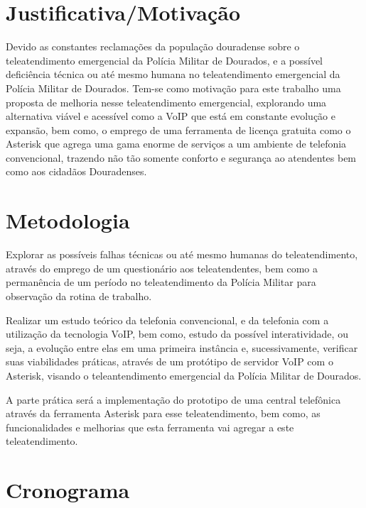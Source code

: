 \section{Justificativa/Motivação}
Devido as constantes reclamações da população douradense sobre o teleatendimento emergencial da Polícia Militar de Dourados, e a possível deficiência técnica ou até mesmo humana no teleatendimento emergencial da Polícia Militar de Dourados. Tem-se como motivação para este trabalho uma proposta de melhoria nesse teleatendimento emergencial, explorando uma alternativa viável e acessível como a VoIP que está em constante evolução e expansão, bem como, o emprego de uma ferramenta de licença gratuita como o Asterisk que agrega uma gama enorme de serviços a um ambiente de telefonia convencional, trazendo não tão somente conforto e segurança ao atendentes bem como aos cidadãos Douradenses.

\section{Metodologia}
Explorar as possíveis falhas técnicas ou até mesmo humanas do teleatendimento, através do emprego de um questionário aos teleatendentes, bem como a permanência de um período no teleatendimento da Polícia Militar para observação da rotina de trabalho.

Realizar um estudo teórico da telefonia convencional, e da telefonia com a utilização da tecnologia VoIP, bem como, estudo da possível interatividade, ou seja, a evolução entre elas em uma primeira instância e, sucessivamente, verificar suas viabilidades práticas, através de um protótipo de servidor VoIP com o Asterisk, visando o teleantendimento emergencial da Polícia Militar de Dourados.

A parte prática será a implementação do prototipo de uma central telefônica através da ferramenta Asterisk para esse teleatendimento, bem como, as funcionalidades e melhorias que esta ferramenta vai agregar a este teleatendimento.  
\newpage
\section{Cronograma}
\thispagestyle{empty}

